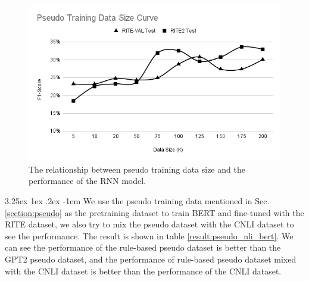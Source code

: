 \documentclass[12pt]{article}
\makeatletter
\renewcommand\paragraph{\@startsection{paragraph}{5}{\z@}%
  {3.25ex \@plus1ex \@minus.2ex}%
  {-1em}%
  {\normalfont\normalsize\bfseries}}
\makeatother
\begin{document}
\begin{CJK*}{UTF8}{bkai}
\begin{spacing}{1.77}
\begin{figure}[H]
  \centering
  \includegraphics[width=15cm]{PseudoTrainingDataSizeCurve.png}
  \caption[Pseudo Training Data Size Curve]{The relationship between pseudo training data size and the performance of the RNN model.}
  \label{fig:pseudo_datasize}
\end{figure}

\paragraph{}
We use the pseudo training data mentioned in Sec. \ref{section:pseudo} as the pretraining dataset to train BERT and fine-tuned with the RITE dataset, we also try to mix the pseudo dataset with the CNLI dataset to see the performance. The result is shown in table \ref{result:pseudo_nli_bert}. We can see the performance of the rule-based pseudo dataset is better than the GPT2 pseudo dataset, and the performance of rule-based pseudo dataset mixed with the CNLI dataset is better than the performance of the CNLI dataset.


\end{spacing}
\end{CJK*}
\end{document}
